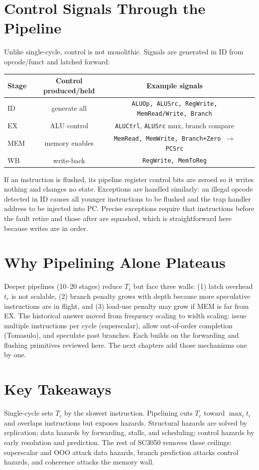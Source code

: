\section{Control Signals Through the Pipeline}
Unlike single-cycle, control is not monolithic. Signals are generated in ID from opcode/funct and latched forward:
\begin{center}
\begin{tabular}{lcccc}
\toprule Stage & Control produced/held & Example signals \\ \midrule
ID  & generate all & \texttt{ALUOp, ALUSrc, RegWrite, MemRead/Write, Branch} \\
EX  & ALU control & \texttt{ALUCtrl}, \texttt{ALUSrc} mux, branch compare \\
MEM & memory enables & \texttt{MemRead, MemWrite, Branch+Zero $\to$ PCSrc} \\
WB  & write-back & \texttt{RegWrite, MemToReg} \\ \bottomrule
\end{tabular}
\end{center}
If an instruction is flushed, its pipeline register control bits are zeroed so it writes nothing and changes no state. Exceptions are handled similarly: an illegal opcode detected in ID causes all younger instructions to be flushed and the trap handler address to be injected into PC. Precise exceptions require that instructions before the fault retire and those after are squashed, which is straightforward here because writes are in order.

\section{Why Pipelining Alone Plateaus}
Deeper pipelines (10--20 stages) reduce $T_c$ but face three walls: (1) latch overhead $t_r$ is not scalable, (2) branch penalty grows with depth because more speculative instructions are in flight, and (3) load-use penalty may grow if MEM is far from EX. The historical answer moved from frequency scaling to width scaling: issue multiple instructions per cycle (superscalar), allow out-of-order completion (Tomasulo), and speculate past branches. Each builds on the forwarding and flushing primitives reviewed here. The next chapters add those mechanisms one by one.

\section{Key Takeaways}
Single-cycle sets $T_c$ by the slowest instruction. Pipelining cuts $T_c$ toward $\max_i t_i$ and overlaps instructions but exposes hazards. Structural hazards are solved by replication; data hazards by forwarding, stalls, and scheduling; control hazards by early resolution and prediction. The rest of SC3050 removes these ceilings: superscalar and OOO attack data hazards, branch prediction attacks control hazards, and coherence attacks the memory wall.

